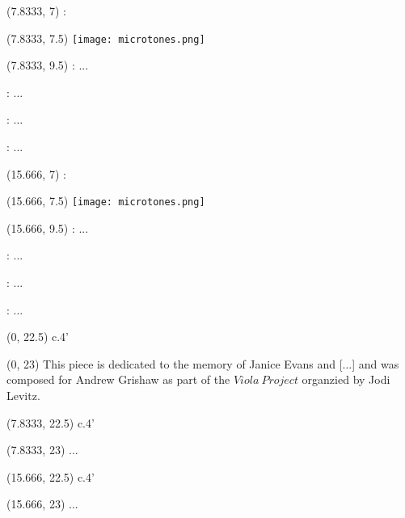 \documentclass[10pt]{article}
\begin{document}
\begin{textblock}{7.333}(7.8333, 7)
:
\end{textblock}

\begin{textblock}{23}(7.8333, 7.5)
\texttt{[image: microtones.png]}
\end{textblock}

\begin{textblock}{7.333}(7.8333, 9.5)
 : ...

 : ...

 : ...

 : ...
\end{textblock}











\begin{textblock}{7.333}(15.666, 7)
:
\end{textblock}

\begin{textblock}{23}(15.666, 7.5)
\texttt{[image: microtones.png]}
\end{textblock}

\begin{textblock}{7.333}(15.666, 9.5)
 : ...

 : ...

 : ...

 : ...
\end{textblock}


\begin{textblock}{7.333}(0, 22.5)
c.4'
\end{textblock}

\begin{textblock}{7.333}(0, 23)
This piece is dedicated to the memory of Janice Evans and [...] and was composed for Andrew Grishaw as part of the $Viola \ Project$ organzied by Jodi Levitz.
\end{textblock}


\begin{textblock}{7.333}(7.8333, 22.5)
c.4'
\end{textblock}

\begin{textblock}{7.333}(7.8333, 23)
...
\end{textblock}


\begin{textblock}{7.333}(15.666, 22.5)
c.4'
\end{textblock}

\begin{textblock}{7.333}(15.666, 23)
...
\end{textblock}
\end{document}
